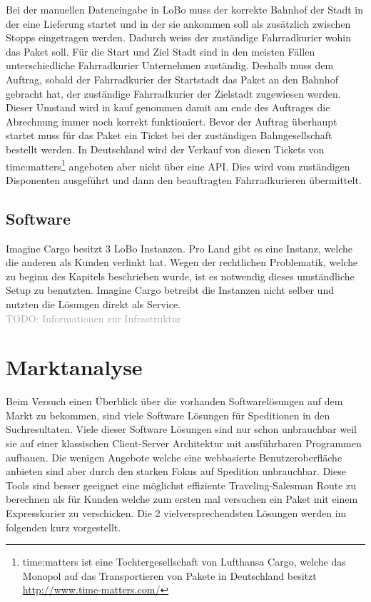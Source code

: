 Bei der manuellen Dateneingabe in LoBo muss der korrekte Bahnhof der Stadt in der eine Lieferung startet und in der sie ankommen soll als zusätzlich zwischen Stopps eingetragen werden. Dadurch weiss der zuständige Fahrradkurier wohin das Paket soll.  Für die Start und Ziel Stadt sind in den meisten Fällen unterschiedliche Fahrradkurier Unternehmen zuständig. Deshalb muss dem Auftrag, sobald der Fahrradkurier der Startstadt das Paket an den Bahnhof gebracht hat, der zuständige Fahrradkurier der Zielstadt zugewiesen werden. Dieser Umstand wird in kauf genommen damit am ende des Auftrages die Abrechnung immer noch korrekt funktioniert. Bevor der Auftrag überhaupt startet muss für das Paket ein Ticket bei der zuständigen Bahngesellschaft bestellt werden. In Deutschland wird der Verkauf von diesen Tickets von time:matters\footnote{time:matters ist eine Tochtergesellschaft von Lufthansa Cargo, welche das Monopol auf das Transportieren von Pakete in Deutschland besitzt \url{http://www.time-matters.com/}} angeboten aber nicht über eine API. Dies wird vom zuständigen Disponenten ausgeführt und dann den beauftragten Fahrradkurieren übermittelt.

\subsection{Software}
Imagine Cargo besitzt 3 LoBo Instanzen. Pro Land gibt es eine Instanz, welche die anderen als Kunden verlinkt hat. Wegen der rechtlichen Problematik, welche zu beginn des Kapitels beschrieben wurde, ist es notwendig dieses umständliche Setup zu benutzten. Imagine Cargo betreibt die Instanzen nicht selber und nutzten die Lösungen direkt als Service.
\\
\textcolor{darkgray}{
  TODO: Informationen zur Infrastruktur
}


\section{Marktanalyse}
Beim Versuch einen Überblick über die vorhanden Softwarelösungen auf dem Markt zu bekommen, sind viele Software Lösungen für Speditionen in den Suchresultaten. Viele dieser Software Lösungen sind nur schon unbrauchbar weil sie auf einer klassischen Client-Server Architektur mit ausführbaren Programmen aufbauen. Die wenigen Angebote welche eine webbasierte Benutzeroberfläche anbieten sind aber durch den starken Fokus auf Spedition unbrauchbar. Diese Tools sind besser geeignet eine möglichst effiziente Traveling-Salesman Route zu berechnen als für Kunden welche zum ersten mal versuchen ein Paket mit einem Expresskurier zu verschicken. Die 2 vielversprechendsten Lösungen werden im folgenden kurz vorgestellt.

